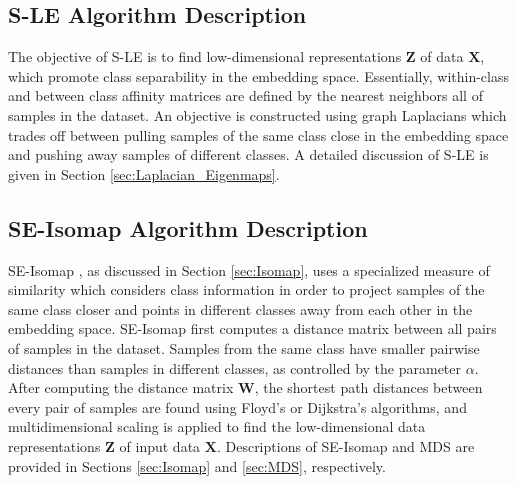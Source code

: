 \subsection{S-LE Algorithm Description}
The objective of S-LE \citep{Raducanu2012SupervisedNonlinearDimReduction} is to find low-dimensional representations $\bm{Z}$ of data $\bm{X}$, which promote class separability in the embedding space.  Essentially, within-class and between class affinity matrices are defined by the nearest neighbors all of samples in the dataset.  An objective is constructed using graph Laplacians  which trades off between pulling samples of the same class close in the embedding space and pushing away samples of different classes.   A detailed discussion of S-LE is given in Section \ref{sec:Laplacian_Eigenmaps}.

\subsection{SE-Isomap Algorithm Description}
SE-Isomap \citep{Ribeiro2008SupervisedIsomap}, as discussed in Section \ref{sec:Isomap}, uses a specialized measure of similarity which considers class information in order to project samples of the same class closer and points in different classes away from each other in the embedding space. SE-Isomap first computes a distance matrix between all pairs of samples in the dataset.  Samples from the same class have smaller pairwise distances than samples in different classes, as controlled by the parameter $\alpha$.  After computing the distance matrix $\bm{W}$, the shortest path distances between every pair of samples are found using Floyd's or Dijkstra's algorithms, and multidimensional  scaling is applied to find the low-dimensional data representations $\bm{Z}$ of input data $\bm{X}$. Descriptions of SE-Isomap and MDS are provided in Sections \ref{sec:Isomap} and \ref{sec:MDS}, respectively.



